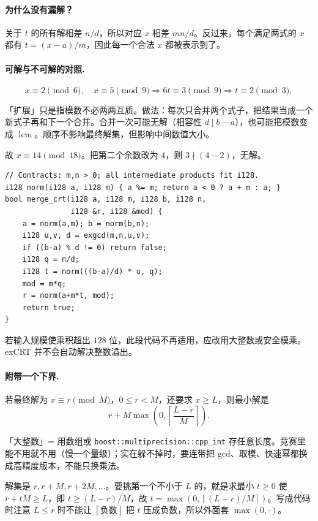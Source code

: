 \documentclass[UTF8,a4paper,11pt,twoside,openright,fontset=fandol]{ctexbook}
\theoremstyle{definition}
\newcommand{\lcm}{\operatorname{lcm}}
\newcommand{\ceil}[1]{\left\lceil #1\right\rceil}
\begin{document}
\paragraph{为什么没有漏解？}
关于 $t$ 的所有解相差 $n/d$，所以对应 $x$ 相差 $mn/d$。反过来，每个满足两式的 $x$ 都有 $t=(x-a)/m$，因此每一个合法 $x$ 都被表示到了。
\paragraph{可解与不可解的对照.}
\[
 x\equiv2\pmod6,\quad x\equiv5\pmod9
 \Longrightarrow 6t\equiv3\pmod9
 \Longrightarrow t\equiv2\pmod3,
\]

\begin{tip}[词义：扩展 CRT 的「扩展」]
「扩展」只是指模数不必两两互质。做法：每次只合并两个式子，把结果当成一个新式子再和下一个合并。合并一次可能无解（相容性 $d\mid b-a$），也可能把模数变成 $\lcm$。顺序不影响最终解集，但影响中间数值大小。
\end{tip}

故 $x\equiv14\pmod{18}$。把第二个余数改为 $4$，则 $3\nmid(4-2)$，无解。

\begin{lstlisting}
// Contracts: m,n > 0; all intermediate products fit i128.
i128 norm(i128 a, i128 m) { a %= m; return a < 0 ? a + m : a; }
bool merge_crt(i128 a, i128 m, i128 b, i128 n,
               i128 &r, i128 &mod) {
    a = norm(a,m); b = norm(b,n);
    i128 u,v, d = exgcd(m,n,u,v);
    if ((b-a) % d != 0) return false;
    i128 q = n/d;
    i128 t = norm(((b-a)/d) * u, q);
    mod = m*q;
    r = norm(a+m*t, mod);
    return true;
}
\end{lstlisting}
若输入规模使乘积超出 $128$ 位，此段代码不再适用，应改用大整数或安全模乘。exCRT 并不会自动解决整数溢出。

\paragraph{附带一个下界.} 若最终解为 $x\equiv r\pmod M$，$0\le r<M$，还要求 $x\ge L$，则最小解是
\[
 r+M\max\!\left(0,\ceil{\frac{L-r}{M}}\right).
\]

\begin{tip}
「大整数」= 用数组或 \texttt{boost::multiprecision::cpp\_int} 存任意长度。竞赛里能不用就不用（慢一个量级）；实在躲不掉时，要连带把 gcd、取模、快速幂都换成高精度版本，不能只换乘法。
\end{tip}

\begin{tip}[下界公式是怎么推出来的]
解集是 $r,r+M,r+2M,\ldots$。要挑第一个不小于 $L$ 的，就是求最小 $t\ge0$ 使 $r+tM\ge L$，即 $t\ge(L-r)/M$，故 $t=\max(0,\ceil{(L-r)/M})$。写成代码时注意 $L\le r$ 时不能让 $\ceil{\text{负数}}$ 把 $t$ 压成负数，所以外面套 $\max(0,\cdot)$。
\end{tip}
\end{document}
